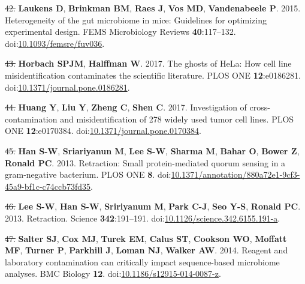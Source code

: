 \documentclass[]{article}
\providecommand{\DIFaddtex}[1]{{\protect\color{blue}\uwave{#1}}} %
\providecommand{\DIFdeltex}[1]{{\protect\color{red}\sout{#1}}}                      %
\providecommand{\DIFaddbegin}{} %
\providecommand{\DIFaddend}{} %
\providecommand{\DIFdelbegin}{} %
\providecommand{\DIFdelend}{} %
\providecommand{\DIFadd}[1]{\texorpdfstring{\DIFaddtex{#1}}{#1}} %
\providecommand{\DIFdel}[1]{\texorpdfstring{\DIFdeltex{#1}}{}} %
\begin{document}
\hypertarget{ref-Laukens2015}{}
\DIFdelbegin \DIFdel{42. }\DIFdelend \DIFaddbegin \DIFadd{48. }\DIFaddend \textbf{Laukens D}, \textbf{Brinkman BM}, \textbf{Raes J},
\textbf{Vos MD}, \textbf{Vandenabeele P}. 2015. Heterogeneity of the gut
microbiome in mice: Guidelines for optimizing experimental design. FEMS
Microbiology Reviews \textbf{40}:117--132.
doi:\href{https://doi.org/10.1093/femsre/fuv036}{10.1093/femsre/fuv036}.

\hypertarget{ref-Horbach2017}{}
\DIFdelbegin \DIFdel{43. }\DIFdelend \DIFaddbegin \DIFadd{49. }\DIFaddend \textbf{Horbach SPJM}, \textbf{Halffman W}. 2017. The ghosts of
HeLa: How cell line misidentification contaminates the scientific
literature. PLOS ONE \textbf{12}:e0186281.
doi:\href{https://doi.org/10.1371/journal.pone.0186281}{10.1371/journal.pone.0186281}.

\hypertarget{ref-Huang2017}{}
\DIFdelbegin \DIFdel{44. }\DIFdelend \DIFaddbegin \DIFadd{50. }\DIFaddend \textbf{Huang Y}, \textbf{Liu Y}, \textbf{Zheng C}, \textbf{Shen C}.
2017. Investigation of cross-contamination and misidentification of 278
widely used tumor cell lines. PLOS ONE \textbf{12}:e0170384.
doi:\href{https://doi.org/10.1371/journal.pone.0170384}{10.1371/journal.pone.0170384}.

\hypertarget{ref-Han2013}{}
\DIFdelbegin \DIFdel{45. }\DIFdelend \DIFaddbegin \DIFadd{51. }\DIFaddend \textbf{Han S-W}, \textbf{Sriariyanun M}, \textbf{Lee S-W},
\textbf{Sharma M}, \textbf{Bahar O}, \textbf{Bower Z}, \textbf{Ronald
PC}. 2013. Retraction: Small protein-mediated quorum sensing in a
gram-negative bacterium. PLOS ONE \textbf{8}.
doi:\href{https://doi.org/10.1371/annotation/880a72e1-9cf3-45a9-bf1c-c74ccb73fd35}{10.1371/annotation/880a72e1-9cf3-45a9-bf1c-c74ccb73fd35}.

\hypertarget{ref-Lee2013}{}
\DIFdelbegin \DIFdel{46. }\DIFdelend \DIFaddbegin \DIFadd{52. }\DIFaddend \textbf{Lee S-W}, \textbf{Han S-W}, \textbf{Sririyanum M},
\textbf{Park C-J}, \textbf{Seo Y-S}, \textbf{Ronald PC}. 2013.
Retraction. Science \textbf{342}:191--191.
doi:\href{https://doi.org/10.1126/science.342.6155.191-a}{10.1126/science.342.6155.191-a}.

\hypertarget{ref-Salter2014}{}
\DIFdelbegin \DIFdel{47. }\DIFdelend \DIFaddbegin \DIFadd{53. }\DIFaddend \textbf{Salter SJ}, \textbf{Cox MJ}, \textbf{Turek EM},
\textbf{Calus ST}, \textbf{Cookson WO}, \textbf{Moffatt MF},
\textbf{Turner P}, \textbf{Parkhill J}, \textbf{Loman NJ},
\textbf{Walker AW}. 2014. Reagent and laboratory contamination can
critically impact sequence-based microbiome analyses. BMC Biology
\textbf{12}.
doi:\href{https://doi.org/10.1186/s12915-014-0087-z}{10.1186/s12915-014-0087-z}.
\end{document}
